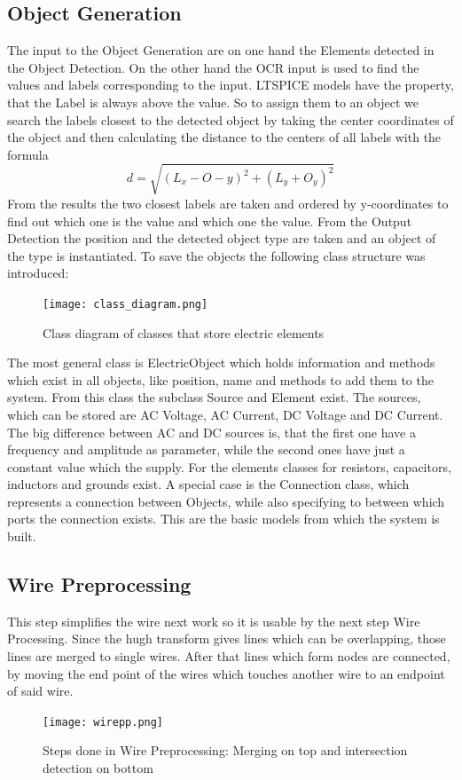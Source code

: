 \documentclass[10pt,twocolumn,letterpaper]{article}
\begin{document}
\subsection{Object Generation}
The input to the Object Generation are on one hand the Elements detected in the Object Detection. On the other hand the OCR input is used to find the values and labels corresponding to the input. LTSPICE models have the property, that the Label is always above the value. So to assign them to an object we search the labels closest to the detected object by taking the center coordinates of the object and then calculating the distance to the centers of all labels with the formula
\[
    d = \sqrt{(L_x-O-y)^2+(L_y+O_y)^2}
\]
From the results the two closest labels are taken and ordered by y-coordinates to find out which one is the value and which one the value. From the Output Detection the position and the detected object type are taken and an object of the type is instantiated. To save the objects the following class structure was introduced:
\begin{figure}[!ht]
\texttt{[image: class\_diagram.png]}
\caption{Class diagram of classes that store electric elements}
\label{fig:o1}
\end{figure}
The most general class is ElectricObject which holds information and methods which exist in all objects, like position, name and methods to add them to the system. From this class the subclass Source and Element exist. The sources, which can be stored are AC Voltage, AC Current, DC Voltage and DC Current. The big difference between AC and DC sources is, that the first one have a frequency and amplitude as parameter, while the second ones have just a constant value which the supply. For the elements classes for resistors, capacitors, inductors and grounds exist. A special case is the Connection class, which represents a connection between Objects, while also specifying to between which ports the connection exists. This are the basic models from which the system is built.

\subsection{Wire Preprocessing}
This step simplifies the wire next work so it is usable by the next step Wire Processing. Since the hugh transform gives lines which can be overlapping, those lines are merged to
single wires. After that lines which form nodes are connected, by moving the end point of the wires which touches another wire to an endpoint of said wire.
\begin{figure}[!ht]
\texttt{[image: wirepp.png]}
\caption{Steps done in Wire Preprocessing: Merging on top and intersection detection on bottom}
\label{fig:o2}
\end{figure}
\end{document}
